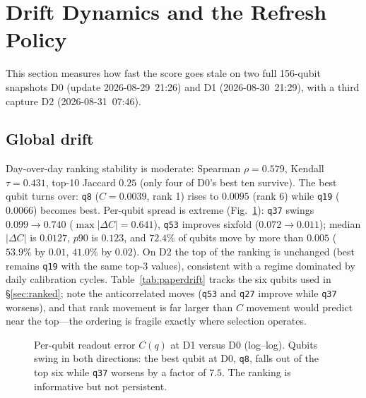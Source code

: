\documentclass[journal,10pt,twocolumn]{IEEEtran}
\newcommand{\q}[1]{\texttt{q#1}}
\begin{document}
\section{Drift Dynamics and the Refresh Policy}
\label{sec:drift}
This section measures how fast the score goes stale on two full 156-qubit snapshots D0 (update 2026-08-29~21:26)
and D1 (2026-08-30~21:29), with a third capture D2 (2026-08-31~07:46).

\subsection{Global drift}
\label{sec:driftglob}
Day-over-day ranking stability is moderate: Spearman $\rho{=}0.579$, Kendall $\tau{=}0.431$, top-10 Jaccard $0.25$
(only four of D0's best ten survive). The best qubit turns over: \q{8} ($C{=}0.0039$, rank 1) rises to $0.0095$
(rank 6) while \q{19} ($0.0066$) becomes best. Per-qubit spread is extreme (Fig.~\ref{fig:driftq}): \q{37} swings
$0.099{\to}0.740$ ($\max|\Delta C|{=}0.641$), \q{53} improves sixfold ($0.072{\to}0.011$); median $|\Delta C|$ is
$0.0127$, $p90$ is $0.123$, and $72.4\%$ of qubits move by more than $0.005$ ($53.9\%$ by $0.01$, $41.0\%$ by
$0.02$). On D2 the top of the ranking is unchanged (best remains \q{19} with the same top-3 values), consistent
with a regime dominated by daily calibration cycles. Table~\ref{tab:paperdrift} tracks the six qubits used in
\S\ref{sec:ranked}; note the anticorrelated moves (\q{53} and \q{27} improve while \q{37} worsens), and that rank
movement is far larger than $C$ movement would predict near the top---the ordering is fragile exactly where
selection operates.

\begin{figure}[t]
\centering
{}%
\caption{Per-qubit readout error $C(q)$ at D1 versus D0 (log--log). Qubits swing in both directions: the best qubit
at D0, \q{8}, falls out of the top six while \q{37} worsens by a factor of $7.5$. The ranking is informative but
not persistent.}
\label{fig:driftq}
\end{figure}
\end{document}

